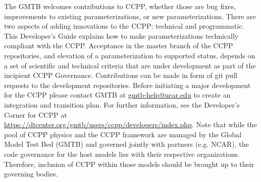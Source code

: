 The GMTB welcomes contributions to CCPP, whether those are bug fixes, improvements to existing parameterizations, or new parameterizations. There are two aspects of adding innovations to the CCPP: technical and programmatic. This Developer's Guide explains how to make parameterizations technically compliant with the CCPP. Acceptance in the master branch of the CCPP repositories, and elevation of a parameterization to supported status, depends on a set of scientific and technical criteria that are under development as part of the incipient CCPP Governance. Contributions can be made in form of git pull requests to the development repositories. Before initiating a major development for the CCPP please contact GMTB at \url{gmtb-help@ucar.edu} to create an integration and transition plan. For further information, see the Developer's Corner for CCPP at \url{https://dtcenter.org/gmtb/users/ccpp/developers/index.php}. Note that while the pool of CCPP physics and the CCPP framework are managed by the Global Model Test Bed (GMTB) and governed jointly with partners (e.g. NCAR), the code governance for the host models lies with their respective organizations. Therefore, inclusion of CCPP within those models should be brought up to their governing bodies.